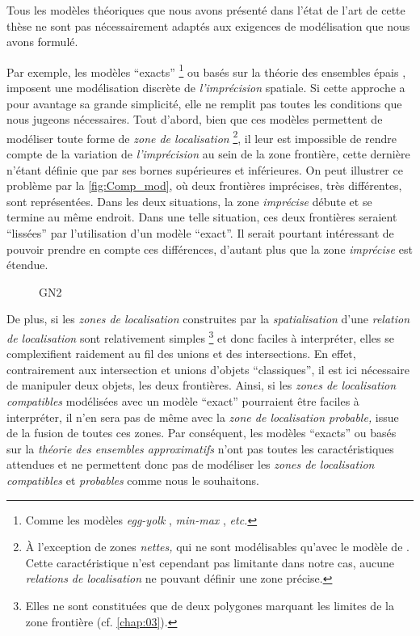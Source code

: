 Tous les modèles théoriques que nous avons présenté dans l'état de
l'art de cette thèse ne sont pas nécessairement adaptés aux exigences
de modélisation que nous avons formulé.

%
Par exemple, les modèles \enquote{exacts} \footnote{Comme les modèles
  \emph{egg-yolk} \autocite{Cohn1996}, \emph{min-max}
  \autocite{Clementini1996}, \emph{etc.}} ou basés sur la théorie des
ensembles épais \autocite{Pawlak1982}, imposent une modélisation
discrète de \emph{l'imprécision} spatiale. Si cette approche a pour
avantage sa grande simplicité, elle ne remplit pas toutes les
conditions que nous jugeons nécessaires. Tout d'abord, bien que ces
modèles permettent de modéliser toute forme de \emph{zone de
  localisation} \footnote{À l'exception de zones \emph{nettes,} qui ne
  sont modélisables qu'avec le modèle de \textcite{Bejaoui2009}. Cette
  caractéristique n'est cependant pas limitante dans notre cas, aucune
  \emph{relations de localisation} ne pouvant définir une zone
  précise.}, il leur est impossible de rendre compte de la variation
de \emph{l'imprécision} au sein de la zone frontière, cette dernière
n'étant définie que par ses bornes supérieures et inférieures. On peut
illustrer ce problème par la \autoref{fig:Comp_mod}, où deux
frontières imprécises, très différentes, sont représentées. Dans les
deux situations, la zone \emph{imprécise} débute et se termine au même
endroit. Dans une telle situation, ces deux frontières seraient
\enquote{lissées} par l'utilisation d'un modèle \enquote{exact}. Il
serait pourtant intéressant de pouvoir prendre en compte ces
différences, d'autant plus que la zone \emph{imprécise} est étendue.

\begin{figure}
  \centering
  
  \caption{GN2}
  \label{fig:Comp_mod}
\end{figure}

De plus, si les \emph{zones de localisation} construites par la
\emph{spatialisation} d'une \emph{relation de localisation} sont
relativement simples \footnote{Elles ne sont constituées que de deux
  polygones marquant les limites de la zone frontière
  (cf. \autoref{chap:03}).} et donc faciles à interpréter, elles se
complexifient raidement au fil des unions et des intersections. En
effet, contrairement aux intersection et unions d'objets
\enquote{classiques}, il est ici nécessaire de manipuler deux objets,
les deux frontières. Ainsi, si les \emph{zones de localisation
  compatibles} modélisées avec un modèle \enquote{exact} pourraient
être faciles à interpréter, il n'en sera pas de même avec la
\emph{zone de localisation probable,} issue de la fusion de toutes ces
zones. Par conséquent, les modèles \enquote{exacts} ou basés sur la
\emph{théorie des ensembles approximatifs} n'ont pas toutes les
caractéristiques attendues et ne permettent donc pas de modéliser les
\emph{zones de localisation compatibles} et \emph{probables} comme
nous le souhaitons.


